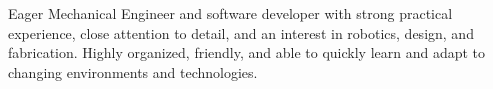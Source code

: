 \begin{minipage}[t]{0.5\sectionHeaderIndent}
    \hspace{0em}
\end{minipage}%
\begin{minipage}[t]{\textwidth - \sectionHeaderIndent}
    Eager Mechanical Engineer and software developer with strong practical experience, close attention to detail, and an interest in robotics, design, and fabrication. Highly organized, friendly, and able to quickly learn and adapt to changing environments and technologies.
\end{minipage}
\break
